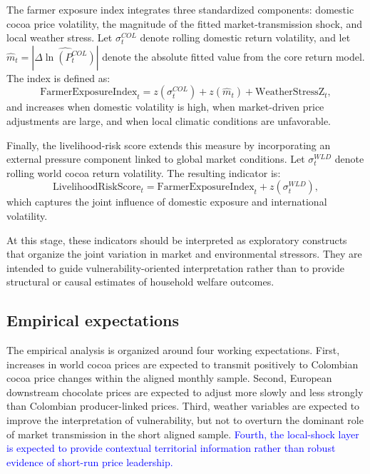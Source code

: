 \documentclass[11pt]{article}
\newcommand{\vTwo}[1]{\textcolor{blue}{#1}}
\begin{document}
The farmer exposure index integrates three standardized components: domestic cocoa price volatility, the magnitude of the fitted market-transmission shock, and local weather stress. Let $\sigma^{COL}_t$ denote rolling domestic return volatility, and let $\widehat{m}_t = \left| \widehat{\Delta \ln(P^{COL}_{t})} \right|$ denote the absolute fitted value from the core return model. The index is defined as:
\begin{equation}
\mathrm{FarmerExposureIndex}_t = z(\sigma^{COL}_t) + z(\widehat{m}_t) + \mathrm{WeatherStressZ}_t,
\label{eq:farmer_exposure}
\end{equation}
and increases when domestic volatility is high, when market-driven price adjustments are large, and when local climatic conditions are unfavorable.

Finally, the livelihood-risk score extends this measure by incorporating an external pressure component linked to global market conditions. Let $\sigma^{WLD}_t$ denote rolling world cocoa return volatility. The resulting indicator is:
\begin{equation}
\mathrm{LivelihoodRiskScore}_t = \mathrm{FarmerExposureIndex}_t + z(\sigma^{WLD}_t),
\label{eq:livelihood_risk}
\end{equation}
which captures the joint influence of domestic exposure and international volatility.

At this stage, these indicators should be interpreted as exploratory constructs that organize the joint variation in market and environmental stressors. They are intended to guide vulnerability-oriented interpretation rather than to provide structural or causal estimates of household welfare outcomes.

\subsection{Empirical expectations}

The empirical analysis is organized around four working expectations. First, increases in world cocoa prices are expected to transmit positively to Colombian cocoa price changes within the aligned monthly sample. Second, European downstream chocolate prices are expected to adjust more slowly and less strongly than Colombian producer-linked prices. Third, weather variables are expected to improve the interpretation of vulnerability, but not to overturn the dominant role of market transmission in the short aligned sample. \vTwo{Fourth, the local-shock layer is expected to provide contextual territorial information rather than robust evidence of short-run price leadership.}
\end{document}
